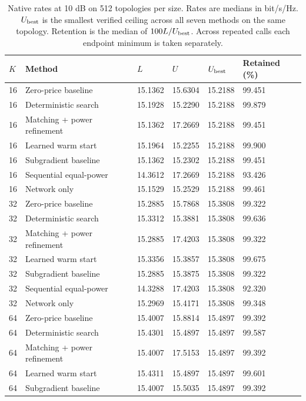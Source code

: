 \begin{table}[htbp]\centering\small
\setlength{\tabcolsep}{4pt}
\caption{Native rates at 10 dB on 512 topologies per size. Rates are medians in bit/s/Hz. $U_{\rm best}$ is the smallest verified ceiling across all seven methods on the same topology. Retention is the median of $100 L/U_{\rm best}$. Across repeated calls each endpoint minimum is taken separately.}\label{supp:rates}
\begin{tabular}{llllll}\toprule
$K$ & Method & $L$ & $U$ & $U_{\rm best}$ & Retained (\%)\\
\midrule
16 & Zero-price baseline & 15.1362 & 15.6304 & 15.2188 & 99.451\\
16 & Deterministic search & 15.1928 & 15.2290 & 15.2188 & 99.879\\
16 & Matching + power refinement & 15.1362 & 17.2669 & 15.2188 & 99.451\\
16 & Learned warm start & 15.1964 & 15.2255 & 15.2188 & 99.900\\
16 & Subgradient baseline & 15.1362 & 15.2302 & 15.2188 & 99.451\\
16 & Sequential equal-power & 14.3612 & 17.2669 & 15.2188 & 93.426\\
16 & Network only & 15.1529 & 15.2529 & 15.2188 & 99.461\\
32 & Zero-price baseline & 15.2885 & 15.7868 & 15.3808 & 99.322\\
32 & Deterministic search & 15.3312 & 15.3881 & 15.3808 & 99.636\\
32 & Matching + power refinement & 15.2885 & 17.4203 & 15.3808 & 99.322\\
32 & Learned warm start & 15.3356 & 15.3857 & 15.3808 & 99.675\\
32 & Subgradient baseline & 15.2885 & 15.3875 & 15.3808 & 99.322\\
32 & Sequential equal-power & 14.3288 & 17.4203 & 15.3808 & 92.320\\
32 & Network only & 15.2969 & 15.4171 & 15.3808 & 99.348\\
64 & Zero-price baseline & 15.4007 & 15.8814 & 15.4897 & 99.392\\
64 & Deterministic search & 15.4301 & 15.4897 & 15.4897 & 99.587\\
64 & Matching + power refinement & 15.4007 & 17.5153 & 15.4897 & 99.392\\
64 & Learned warm start & 15.4311 & 15.4897 & 15.4897 & 99.601\\
64 & Subgradient baseline & 15.4007 & 15.5035 & 15.4897 & 99.392\\

\end{tabular}
\end{table}
